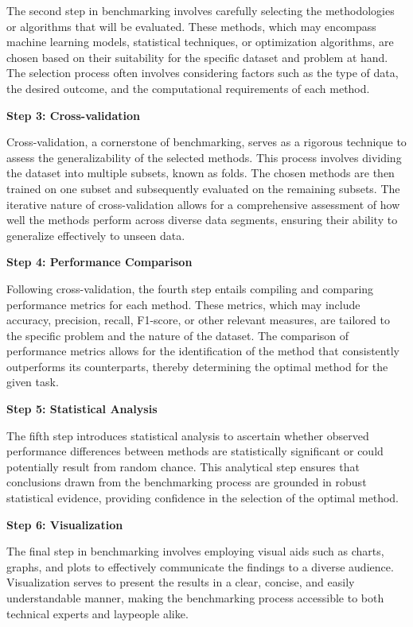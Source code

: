 The second step in benchmarking involves carefully selecting the methodologies or algorithms that will be evaluated. These methods, which may encompass machine learning models, statistical techniques, or optimization algorithms, are chosen based on their suitability for the specific dataset and problem at hand. The selection process often involves considering factors such as the type of data, the desired outcome, and the computational requirements of each method.


\textbf{Step 3: Cross-validation}

Cross-validation, a cornerstone of benchmarking, serves as a rigorous technique to assess the generalizability of the selected methods. This process involves dividing the dataset into multiple subsets, known as folds. The chosen methods are then trained on one subset and subsequently evaluated on the remaining subsets. The iterative nature of cross-validation allows for a comprehensive assessment of how well the methods perform across diverse data segments, ensuring their ability to generalize effectively to unseen data.

\textbf{Step 4: Performance Comparison}

Following cross-validation, the fourth step entails compiling and comparing performance metrics for each method. These metrics, which may include accuracy, precision, recall, F1-score, or other relevant measures, are tailored to the specific problem and the nature of the dataset. The comparison of performance metrics allows for the identification of the method that consistently outperforms its counterparts, thereby determining the optimal method for the given task.

\textbf{Step 5: Statistical Analysis}

The fifth step introduces statistical analysis to ascertain whether observed performance differences between methods are statistically significant or could potentially result from random chance. This analytical step ensures that conclusions drawn from the benchmarking process are grounded in robust statistical evidence, providing confidence in the selection of the optimal method.

\textbf{Step 6: Visualization}

The final step in benchmarking involves employing visual aids such as charts, graphs, and plots to effectively communicate the findings to a diverse audience. Visualization serves to present the results in a clear, concise, and easily understandable manner, making the benchmarking process accessible to both technical experts and laypeople alike.

